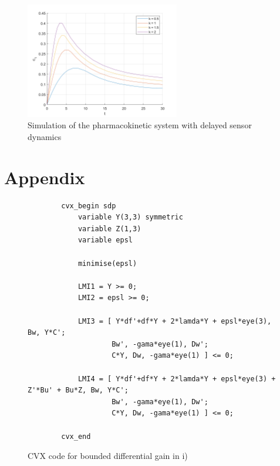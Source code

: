 \documentclass{article}
\begin{document}
\begin{figure}[H]
    \centering
    \includegraphics[width=0.6\textwidth]{figures/23_pharmacokinetic_sim.png}
    \caption{Simulation of the pharmacokinetic system with delayed sensor dynamics}
    \label{fig:pharmacokinetic_sim}
\end{figure}

\section{Appendix}

\begin{figure}[H]
    \centering
    \begin{lstlisting}
        cvx_begin sdp
            variable Y(3,3) symmetric
            variable Z(1,3)
            variable epsl
            
            minimise(epsl)

            LMI1 = Y >= 0;
            LMI2 = epsl >= 0;
            
            LMI3 = [ Y*df'+df*Y + 2*lamda*Y + epsl*eye(3), Bw, Y*C';
                    Bw', -gama*eye(1), Dw';
                    C*Y, Dw, -gama*eye(1) ] <= 0;
            
            LMI4 = [ Y*df'+df*Y + 2*lamda*Y + epsl*eye(3) + Z'*Bu' + Bu*Z, Bw, Y*C';
                    Bw', -gama*eye(1), Dw';
                    C*Y, Dw, -gama*eye(1) ] <= 0;
                
        cvx_end
    \end{lstlisting}
    \caption{CVX code for bounded differential gain in i)}
    \label{fig:bounded_differential_gain_lmi}
\end{figure}
\end{document}
